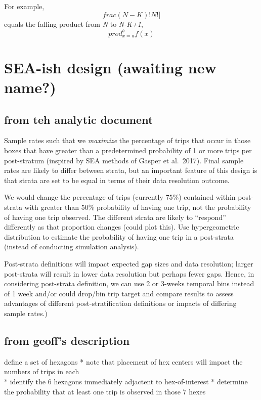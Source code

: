 \documentclass[
]{article}
\begin{document}
For example, \[frac{(N-K)!}{N!}]\] equals the falling product from \emph{N} to
\emph{N-K+1}, \[prod_{x = a}^{b} f(x)\]

\hypertarget{sea-ish-design-awaiting-new-name}{%
\section{SEA-ish design (awaiting new name?)}\label{sea-ish-design-awaiting-new-name}}

\hypertarget{from-teh-analytic-document}{%
\subsection{from teh analytic document}\label{from-teh-analytic-document}}

Sample rates such that we \emph{maximize} the percentage of trips that occur in those
boxes that have greater than a predetermined probability of 1 or more trips per
post-stratum (inspired by SEA methods of Gasper et al.~2017). Final sample rates
are likely to differ between strata, but an important feature of this design is
that strata are set to be equal in terms of their data resolution outcome.

We would change the percentage of trips (currently 75\%) contained within
post-strata with greater than 50\% probability of having one trip, not the
probability of having one trip observed. The different strata are likely to
``respond'' differently as that proportion changes (could plot this). Use
hypergeometric distribution to estimate the probability of having one trip in a
post-strata (instead of conducting simulation analysis).

Post-strata definitions will impact expected gap sizes and data resolution;
larger post-strata will result in lower data resolution but perhaps fewer gaps.
Hence, in considering post-strata definition, we can use 2 or 3-weeks temporal
bins instead of 1 week and/or could drop/bin trip target and compare results to
assess advantages of different post-stratification definitions or impacts of
differing sample rates.)

\hypertarget{from-geoffs-description}{%
\subsection{from geoff's description}\label{from-geoffs-description}}

define a set of hexagons
* note that placement of hex centers will impact the numbers of trips in
each\\
* identify the 6 hexagons immediately adjactent to hex-of-interest
* determine the probability that at least one trip is observed in those 7
hexes
\end{document}
